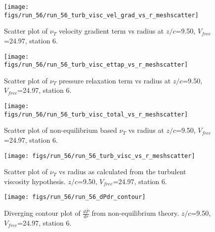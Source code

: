 \begin{figure}[H]
\centering
\texttt{[image: figs/run\_56/run\_56\_turb\_visc\_vel\_grad\_vs\_r\_meshscatter]}
\caption{Scatter plot of $\nu_T$ velocity gradient term vs radius at $z/c$=9.50, $V_{free}$=24.97, station 6.}
\end{figure}


\begin{figure}[H]
\centering
\texttt{[image: figs/run\_56/run\_56\_turb\_visc\_ettap\_vs\_r\_meshscatter]}
\caption{Scatter plot of $\nu_T$ pressure relaxation term vs radius at $z/c$=9.50, $V_{free}$=24.97, station 6.}
\end{figure}


\begin{figure}[H]
\centering
\texttt{[image: figs/run\_56/run\_56\_turb\_visc\_total\_vs\_r\_meshscatter]}
\caption{Scatter plot of non-equilibrium based $\nu_T$ vs radius at $z/c$=9.50, $V_{free}$=24.97, station 6.}
\end{figure}


\begin{figure}[H]
\centering
\texttt{[image: figs/run\_56/run\_56\_turb\_visc\_vs\_r\_meshscatter]}
\caption{Scatter plot of $\nu_T$ vs radius as calculated from the turbulent viscosity hypothesis. $z/c$=9.50, $V_{free}$=24.97, station 6.}
\end{figure}


\begin{figure}[H]
\centering
\texttt{[image: figs/run\_56/run\_56\_dPdr\_contour]}
\caption{Diverging contour plot of $\frac{d\bar{P}}{dr}$ from non-equilibrium theory. $z/c$=9.50, $V_{free}$=24.97, station 6.}
\end{figure}


